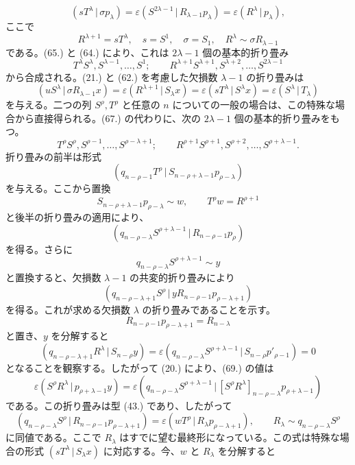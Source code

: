 \documentclass[11pt]{jlreq}
\newcommand{\pair}[2]{(#1\,|\,#2)}
\newcommand{\eps}{\varepsilon}
\begin{document}
\[
 \pair{sT^\lambda}{\sigma p_\lambda}=\eps\pair{S^{2\lambda-1}}{R_{\lambda-1}p_\lambda}=\eps\pair{R^\lambda}{p_\lambda},
\]
ここで
\[
 R^{\lambda+1}=sT^\lambda,
 \quad s=S^1,
 \quad \sigma=S_1,
 \quad R^\lambda\sim\sigma R_{\lambda-1}
\]
である。(65.) と (64.) により、これは $2\lambda-1$ 個の基本的折り畳み
\begin{equation}
 T^\lambda S^\lambda,S^{\lambda-1},\ldots,S^1;
 \qquad R^{\lambda+1}S^{\lambda+1},S^{\lambda+2},\ldots,S^{2\lambda-1}
\tag{67}
\end{equation}
から合成される。(21.) と (62.) を考慮した欠損数 $\lambda-1$ の折り畳みは
\[
 \pair{uS^\lambda}{\sigma R_{\lambda-1}x}=\eps\pair{R^{\lambda+1}}{S_\lambda x}
 =\eps\pair{sT^\lambda}{S^\lambda x}=\eps\pair{S^\lambda}{T_\lambda}
\]
を与える。二つの列 $S^\rho,T^\rho$ と任意の $n$ についての一般の場合は、この特殊な場合から直接得られる。(67.) の代わりに、次の $2\lambda-1$ 個の基本的折り畳みをもつ。
\begin{equation}
 T^\rho S^\rho,S^{\rho-1},\ldots,S^{\rho-\lambda+1};
 \qquad R^{\rho+1}S^{\rho+1},S^{\rho+2},\ldots,S^{\rho+\lambda-1}.
\tag{68}
\end{equation}
折り畳みの前半は形式
\[
 \pair{q_{n-\rho-1}T^\rho}{S_{n-\rho+\lambda-1}p_{\rho-\lambda}}
\]
を与える。ここから置換
\[
 S_{n-\rho+\lambda-1}p_{\rho-\lambda}\sim w,
 \qquad T^\rho w=R^{\rho+1}
\]
と後半の折り畳みの適用により、
\[
 \pair{q_{n-\rho-\lambda}S^{\rho+\lambda-1}}{R_{n-\rho-1}p_\rho}
\]
を得る。さらに
\[
 q_{n-\rho-\lambda}S^{\rho+\lambda-1}\sim y
\]
と置換すると、欠損数 $\lambda-1$ の共変的折り畳みにより
\begin{equation}
 \pair{q_{n-\rho-\lambda+1}S^\rho}{yR_{n-\rho-1}p_{\rho-\lambda+1}}
\tag{69}
\end{equation}
を得る。これが求める欠損数 $\lambda$ の折り畳みであることを示す。
\[
 R_{n-\rho-1}p_{\rho-\lambda+1}=R_{n-\lambda}
\]
と置き、$y$ を分解すると
\[
 \pair{q_{n-\rho-\lambda+1}R^\lambda}{S_{n-\rho}y}
 =\eps\pair{q_{n-\rho-\lambda}S^{\rho+\lambda-1}}{S_{n-\rho}p'_{\rho-1}}=0
\]
となることを観察する。したがって (20.) により、(69.) の値は
\[
 \eps\pair{S^\rho R^\lambda}{p_{\rho+\lambda-1}y}
 =\eps\pair{q_{n-\rho-\lambda}S^{\rho+\lambda-1}}{[S^\rho R^\lambda]_{n-\rho-\lambda}p_{\rho+\lambda-1}}
\]
である。この折り畳みは型 (43.) であり、したがって
\[
 \pair{q_{n-\rho-\lambda}S^\rho}{R_{n-\rho-1}p_{\rho-\lambda+1}}
 =\eps\pair{wT^\rho}{R_\lambda p_{\rho-\lambda+1}},
 \qquad R_\lambda\sim q_{n-\rho-\lambda}S^\rho
\]
に同値である。ここで $R_\lambda$ はすでに望む最終形になっている。この式は特殊な場合の形式 $\pair{sT^\lambda}{S_\lambda x}$ に対応する。今、$w$ と $R_\lambda$ を分解すると
\end{document}
